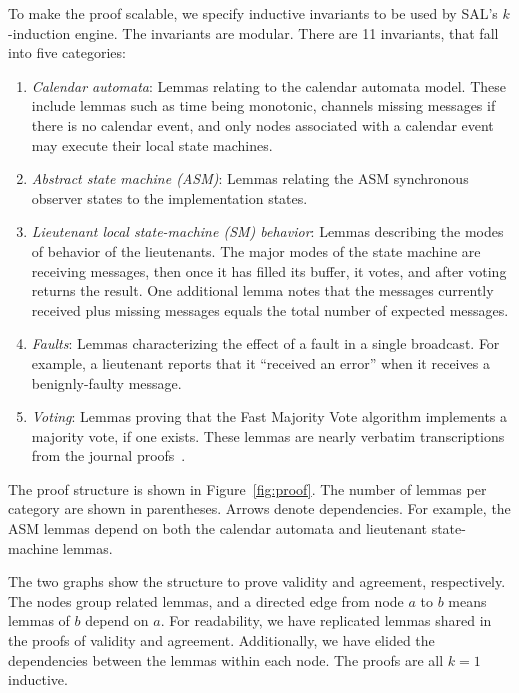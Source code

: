 \documentclass{llncs/llncs}
\newcommand{\lee}[1]{ } %
\newcommand{\lee}[1]{ {\color{blue}$<$lee: #1$>$} } %
\begin{document}
To make the proof scalable, we specify inductive invariants to be used by SAL's $k$-induction engine. The invariants are modular. There are 11 invariants, that fall into five categories:
\begin{enumerate}
  \item \emph{Calendar automata}: Lemmas relating to the calendar automata model. These include lemmas such as time being monotonic, channels missing messages if there is no calendar event, and only nodes associated with a calendar event may execute their local state machines.
  \item \emph{Abstract state machine (ASM)}: Lemmas relating the ASM synchronous observer states to the implementation states.
  \item \emph{Lieutenant local state-machine (SM) behavior}: Lemmas describing the modes of behavior of the lieutenants. The major modes of the state machine are receiving messages, then once it has filled its buffer, it votes, and after voting returns the result. One additional lemma notes that the messages currently received plus missing messages equals the total number of expected messages.
  \item \emph{Faults}: Lemmas characterizing the effect of a fault in a single broadcast. For example, a lieutenant reports that it ``received an error'' when it receives a benignly-faulty message.
  \item \emph{Voting}: Lemmas proving that the Fast Majority Vote algorithm implements a majority vote, if one exists. These lemmas are nearly verbatim transcriptions from the journal proofs~\cite{mjrty}.
\end{enumerate}
\noindent
The proof structure is shown in Figure~\ref{fig:proof}. The number of lemmas per category are shown in parentheses. Arrows denote dependencies. For example, the ASM lemmas depend on both the calendar automata and lieutenant state-machine lemmas.


\lee{make clear we're agnostic about human-provided invariants. We conjecture some can be auto-generated. Some might be inferred by IC3.}


 The two graphs show the structure to prove validity and agreement, respectively. The nodes group related lemmas, and a directed edge from node $a$ to $b$ means lemmas of $b$ depend on $a$. For readability, we have replicated lemmas shared in the proofs of validity and agreement. Additionally, we have elided the dependencies between the lemmas within each node. The proofs are all $k=1$ inductive.
\end{document}
